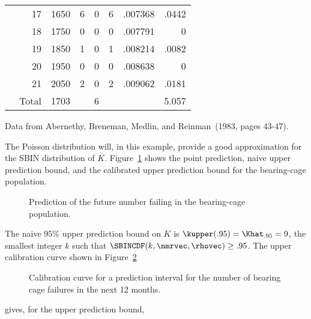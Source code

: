 \begin{example}
\begin{table}
\begin{tabular} {rrrrrrrr}
 & 17 & 1650 & 6 & 0 & 6 & .007368 & .0442 \\  
 & 18 & 1750 & 0 & 0 & 0 & .007791 & 0 \\  
 & 19 & 1850 & 1 & 0 & 1 & .008214 & .0082 \\  
 & 20 & 1950 & 0 & 0 & 0 & .008638 & 0 \\  
 & 21 & 2050 & 2 & 0 & 2 & .009062 & .0181 \\ \hline
&Total&1703&&6&&& 5.057\\ \hline 
\end{tabular}  
\begin{minipage}[t]{4in}
Data from Abernethy, Breneman, Medlin, and Reinman~(1983, pages 43-47).
\end{minipage}
\label{table:bcage.risk.table}
\end{table}
The Poisson distribution will, in this example,
provide a good approximation for the SBIN
distribution of $K$.
Figure~\ref{figure:bcage.pred.exfig.ps} shows
the point prediction, naive upper prediction
bound, and the calibrated upper prediction
bound for the bearing-cage population.
\begin{figure}
\caption{Prediction of the future number
failing in the bearing-cage population.}
\label{figure:bcage.pred.exfig.ps}
\end{figure}
The naive $95\%$ upper prediction bound on $K$ is
$\kupper(.95)=\Khat_{.95}=9$, the smallest integer $k$ such that
$\SBINCDF(k,\nmrvec,\rhovec)\geq .95$.  The upper calibration curve
shown in Figure~\ref{figure:bcage.future.hn.ps}
\begin{figure}
\caption{Calibration curve for a prediction interval for
the number of bearing cage failures in the next 12 months.}
\label{figure:bcage.future.hn.ps}
\end{figure}
gives, for the upper prediction bound,

\end{example}
